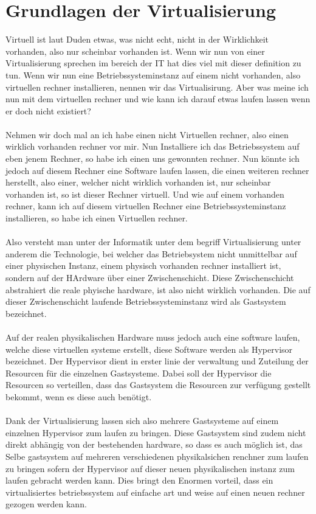 \documentclass[14pt]{extreport}
\begin{document}
\section{Grundlagen der Virtualisierung}
Virtuell ist laut Duden etwas, was nicht echt, nicht in der Wirklichkeit vorhanden, also nur scheinbar vorhanden ist. Wenn wir nun von einer Virtualisierung sprechen im bereich der IT hat dies viel mit dieser definition zu tun. Wenn wir nun eine Betriebssysteminstanz auf einem nicht vorhanden, also virtuellen rechner installieren, nennen wir das Virtualisirung. Aber was meine ich nun mit dem virtuellen rechner und wie kann ich darauf etwas laufen lassen wenn er doch nicht existiert?\\
\\
Nehmen wir doch mal an ich habe einen nicht Virtuellen rechner, also einen wirklich vorhanden rechner vor mir. Nun Installiere ich das Betriebssystem auf eben jenem Rechner, so habe ich einen uns gewonnten rechner. Nun könnte ich jedoch auf diesem Rechner eine Software laufen lassen, die einen weiteren rechner herstellt, also einer, welcher nicht wirklich vorhanden ist, nur scheinbar vorhanden ist, so ist dieser Rechner virtuell. Und wie auf einem vorhanden rechner, kann ich auf diesem virtuellen Rechner eine Betriebssysteminstanz installieren, so habe ich einen Virtuellen rechner.\\
\\
Also versteht man unter der Informatik unter dem begriff Virtualisierung unter anderem die Technologie, bei welcher das Betriebsystem nicht unmittelbar auf einer physischen Instanz, einem physisch vorhanden rechner installiert ist, sondern auf der HArdware über einer Zwischenschicht. Diese Zwischenschicht abstrahiert die reale phyische hardware, ist also nicht wirklich vorhanden. Die auf dieser Zwischenschicht laufende Betriebssysteminstanz wird als Gastsystem bezeichnet. \\
\\
Auf der realen physikalischen Hardware muss jedoch auch eine software laufen, welche diese virtuellen systeme erstellt, diese Software werden als Hypervisor bezeichnet. Der Hypervisor dient in erster linie der verwaltung und Zuteilung der Resourcen für die einzelnen Gastsysteme. Dabei soll der Hypervisor die Resourcen so verteillen, dass das Gastsystem die Resourcen zur verfügung gestellt bekommt, wenn es diese auch benötigt.\\
\\
Dank der Virtualisierung lassen sich also mehrere Gastsysteme auf einem einzelnen Hypervisor zum laufen zu bringen. Diese Gastsystem sind zudem nicht direkt abhängig von der bestehenden hardware, so dass es auch möglich ist, das Selbe gastsystem auf mehreren verschiedenen physikalsichen renchner zum laufen zu bringen sofern der Hypervisor auf dieser neuen physikalischen instanz zum laufen gebracht werden kann. Dies bringt den Enormen vorteil, dass ein virtualisiertes betriebssystem auf einfache art und weise auf einen neuen rechner gezogen werden kann. 
\end{document}
